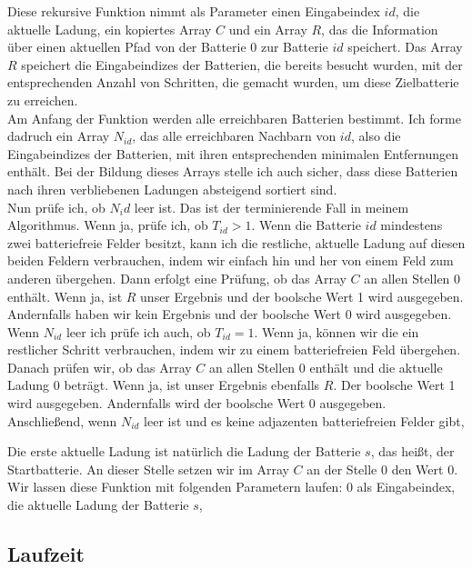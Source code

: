 \documentclass[a4paper,10pt,ngerman]{scrartcl}
\begin{document}
Diese rekursive Funktion nimmt als Parameter einen Eingabeindex $id$, die aktuelle Ladung, ein kopiertes Array $C$
und ein Array $R$, das die Information über einen aktuellen Pfad von der Batterie 0 zur Batterie $id$ speichert.
Das Array $R$ speichert die Eingabeindizes der Batterien, die bereits besucht wurden, mit der entsprechenden Anzahl von Schritten,
die gemacht wurden, um diese Zielbatterie zu erreichen.\\
Am Anfang der Funktion werden alle erreichbaren Batterien bestimmt. Ich forme dadruch ein Array $N_{id}$, das alle
erreichbaren Nachbarn von $id$, also die Eingabeindizes der Batterien, mit ihren entsprechenden minimalen Entfernungen enthält.
Bei der Bildung dieses Arrays stelle ich auch sicher, dass diese Batterien nach ihren verbliebenen Ladungen absteigend
sortiert sind.\\
Nun prüfe ich, ob $N_id$ leer ist. Das ist der terminierende Fall in meinem Algorithmus.
Wenn ja, prüfe ich, ob $T_{id} > 1$. Wenn die Batterie $id$ mindestens zwei batteriefreie Felder besitzt,
kann ich die restliche, aktuelle Ladung auf diesen beiden Feldern verbrauchen, indem wir einfach hin und her von einem 
Feld zum anderen übergehen. 
Dann erfolgt eine Prüfung, ob das Array $C$ an allen Stellen 0 enthält. Wenn ja, ist $R$ unser Ergebnis und der boolsche Wert 1 wird
ausgegeben. Andernfalls haben wir kein Ergebnis und der boolsche Wert 0 wird ausgegeben.\\
Wenn $N_{id}$ leer ich prüfe ich auch, ob $T_{id} = 1$. Wenn ja, können wir die ein restlicher Schritt verbrauchen, 
indem wir zu einem batteriefreien Feld übergehen. Danach prüfen wir, ob das Array $C$ an allen Stellen 0 enthält und die
aktuelle Ladung 0 beträgt. Wenn ja, ist unser Ergebnis ebenfalls $R$. Der boolsche Wert 1 wird ausgegeben. Andernfalls wird
der boolsche Wert 0 ausgegeben.\\
Anschließend, wenn $N_{id}$ leer ist und es keine adjazenten batteriefreien Felder gibt,  


Die erste aktuelle Ladung ist natürlich die Ladung der Batterie $s$, das heißt, der Startbatterie. An dieser Stelle
setzen wir im Array $C$ an der Stelle $0$ den Wert 0.\\
Wir lassen diese Funktion mit folgenden Parametern laufen: 0 als Eingabeindex, die aktuelle Ladung der Batterie $s$, 




\subsection{Laufzeit}\label{sec:time}
\end{document}
